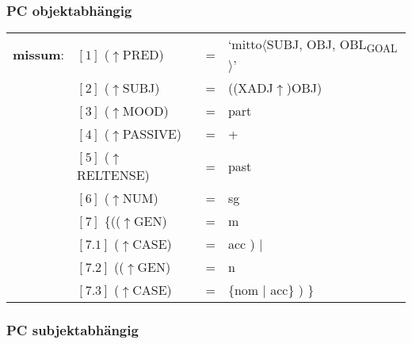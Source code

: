 \documentclass[12pt,a4paper]{article}
\begin{document}
\subsubsection{PC objektabhängig}

\begin{singlespace}
\begin{tabular}{ l  l  l  l  } 
\textbf{missum}: & $[1]$ \:  ($\uparrow$PRED) & = & `mitto$\langle$SUBJ, OBJ, OBL\textsubscript{GOAL}$\rangle$'\\
$\qquad$ & $[2]$ \:  ($\uparrow$SUBJ) & = & ((XADJ$\uparrow$)OBJ)\\
$\qquad$ & $[3]$ \:  ($\uparrow$MOOD) & = & part\\
$\qquad$ & $[4]$ \:  ($\uparrow$PASSIVE) & = & + \\
$\qquad$ & $[5]$ \:  ($\uparrow$RELTENSE) & = & past \\
$\qquad$ & $[6]$ \:  ($\uparrow$NUM) & = & sg \\
$\qquad$ & $[7]$ \:  \{(($\uparrow$GEN) & = & m \\ 
$\qquad$ & $[7.1]$ \:  ($\uparrow$CASE) & = & acc ) $\mid$\\
$\qquad$ & $[7.2]$ \: (($\uparrow$GEN) & = & n \\
$\qquad$ & $[7.3]$ \:  ($\uparrow$CASE) & = & \{nom $\mid$ acc\} ) \}\\
\end{tabular}
\newline
\newline
\end{singlespace}


\subsubsection{PC subjektabhängig}
\end{document}

